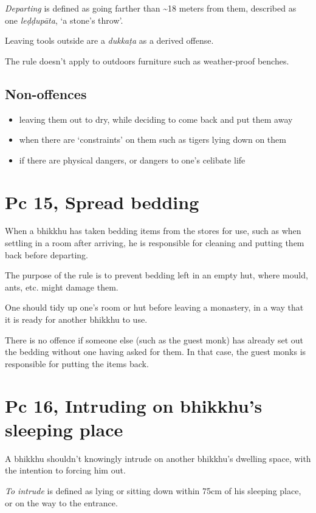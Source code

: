 \emph{Departing} is defined as going farther than \textasciitilde18
meters from them, described as one \emph{leḍḍupāta}, `a stone's throw'.

Leaving tools outside are a \emph{dukkaṭa} as a derived offense.

The rule doesn't apply to outdoors furniture such as weather-proof
benches.

\subsection{Non-offences}

\begin{itemize}
\tightlist
\item
  leaving them out to dry, while deciding to come back and put them away
\item
  when there are `constraints' on them such as tigers lying down on them
\item
  if there are physical dangers, or dangers to one's celibate life
\end{itemize}

\section{Pc 15, Spread bedding}

When a bhikkhu has taken bedding items from the stores for use, such as
when settling in a room after arriving, he is responsible for cleaning
and putting them back before departing.

The purpose of the rule is to prevent bedding left in an empty hut,
where mould, ants, etc. might damage them.

One should tidy up one's room or hut before leaving a monastery, in a
way that it is ready for another bhikkhu to use.

There is no offence if someone else (such as the guest monk) has already
set out the bedding without one having asked for them. In that case, the
guest monks is responsible for putting the items back.

\section{Pc 16, Intruding on bhikkhu's sleeping place}

A bhikkhu shouldn't knowingly intrude on another bhikkhu's dwelling
space, with the intention to forcing him out.

\emph{To intrude} is defined as lying or sitting down within 75cm of his
sleeping place, or on the way to the entrance.

